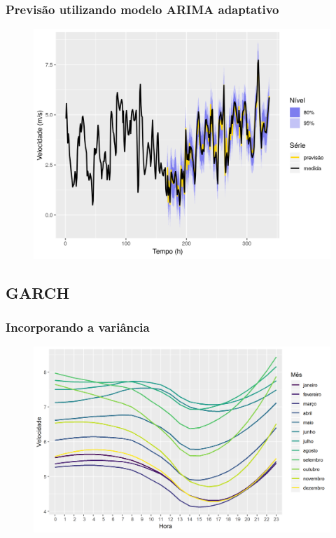 \documentclass[mathserif,serif]{beamer}
\begin{document}
\begin{frame}
	\frametitle{Previsão utilizando modelo ARIMA adaptativo}
	\begin{figure}
		\centering
		\includegraphics[scale=0.6]{var_result}
	\end{figure}
\end{frame}

\subsection{GARCH}

\begin{frame}
	\frametitle{Incorporando a variância}
	\begin{figure}
		\centering
		\includegraphics[scale=0.6]{diurnal}
	\end{figure}
\end{frame}
\end{document}
